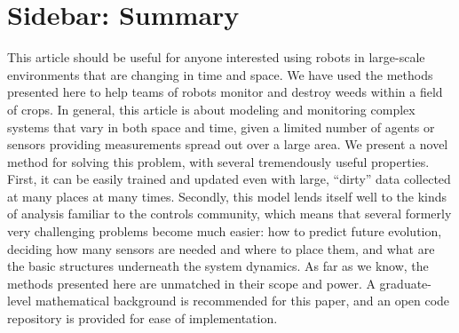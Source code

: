 \documentclass[letterpaper,12pt,peerreviewca,draftcls]{IEEEtran}
\newcommand{\XX}[1]{{\bf XX #1 XX}}
\begin{document}
\clearpage



\processdelayedfloats
\sidebars


\renewcommand{\thealgorithm}{S\arabic{algorithm}} 
\setcounter{algorithm}{0}







\clearpage

\section[Nontechnical summary]{Sidebar: Summary}\label{sb:summary}

This article should be useful for anyone interested using robots in large-scale environments that are changing in time and space. We have used the methods presented here to help teams of robots  monitor and destroy weeds within a field of crops. In general, this article is about modeling and monitoring complex systems that vary in both space and time, given a limited number of agents or sensors providing measurements spread out over a large area. We present a novel method for solving this problem, with several tremendously useful properties. First, it can be easily trained and updated even with large, ``dirty'' data collected at many places at many times. Secondly, this model lends itself well to the kinds of analysis familiar to the controls community, which means that several formerly very challenging problems become much easier: how to predict future evolution, deciding how many sensors are needed and where to place them, and what are the basic structures underneath the system dynamics. As far as we know, the methods presented here are unmatched in their scope and power. A graduate-level mathematical background is recommended for this paper, and an open code repository is provided for ease of implementation.






\clearpage
%
\end{document}
